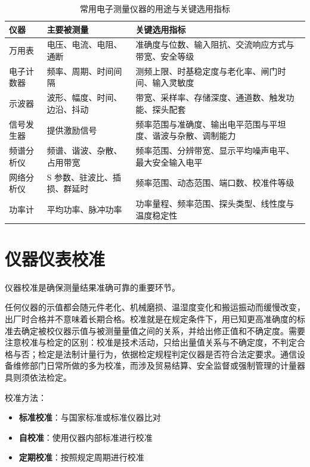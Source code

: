 \begin{table}[htbp]
\centering
\caption{常用电子测量仪器的用途与关键选用指标}
\begin{tabular}{|p{2.4cm}|p{4.6cm}|p{5.8cm}|}
\hline
\textbf{仪器} & \textbf{主要被测量} & \textbf{关键选用指标} \\
\hline
万用表 & 电压、电流、电阻、通断 & 准确度与位数、输入阻抗、交流响应方式与带宽、安全等级 \\
\hline
电子计数器 & 频率、周期、时间间隔 & 测频上限、时基稳定度与老化率、闸门时间、输入灵敏度 \\
\hline
示波器 & 波形、幅度、时间、边沿、抖动 & 带宽、采样率、存储深度、通道数、触发功能、探头配套 \\
\hline
信号发生器 & 提供激励信号 & 频率范围与准确度、输出电平范围与平坦度、谐波与杂散、调制能力 \\
\hline
频谱分析仪 & 频谱、谐波、杂散、占用带宽 & 频率范围、分辨带宽、显示平均噪声电平、最大安全输入电平 \\
\hline
网络分析仪 & S 参数、驻波比、插损、群延时 & 频率范围、动态范围、端口数、校准件等级 \\
\hline
功率计 & 平均功率、脉冲功率 & 功率量程、频率范围、探头类型、线性度与温度稳定性 \\
\hline
\end{tabular}
\end{table}

\section{仪器仪表校准}
\label{sec:instruments_calibration}

仪器校准是确保测量结果准确可靠的重要环节。

任何仪器的示值都会随元件老化、机械磨损、温湿度变化和搬运振动而缓慢改变，出厂时合格并不意味着长期合格。校准就是在规定条件下，用已知更高准确度的标准去确定被校仪器示值与被测量量值之间的关系，并给出修正值和不确定度。需要注意校准与检定的区别：校准是技术活动，只给出量值关系与不确定度，不判定合格与否；检定是法制计量行为，依据检定规程判定仪器是否符合法定要求。通信设备维修部门日常所做的多为校准，而涉及贸易结算、安全监督或强制管理的计量器具则须依法检定。

校准方法：
\begin{itemize}
    \item \textbf{标准校准}：与国家标准或标准仪器比对
    \item \textbf{自校准}：使用仪器内部标准进行校准
    \item \textbf{定期校准}：按照规定周期进行校准
\end{itemize}

